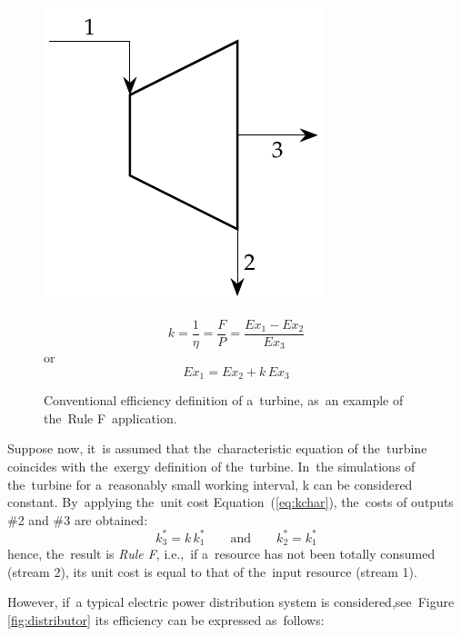 \documentclass[energies,article,accept,moreauthors,pdftex]{Definitions/mdpi}
\begin{document}
\begin{figure}[H]
	\begin{minipage}[c]{0.50\linewidth}
		\centering
		\includegraphics[scale=0.7]{turbine}
	\end{minipage}
	\begin{minipage}[c]{0.48\linewidth}
		\centering
		\begin{equation*}
		k=\frac{1}{\eta}=\frac{F}{P}=\frac{Ex_1 - Ex_2}{Ex_3}
		\label{eq:turb}
		\end{equation*}
		or
		\begin{equation*}
		Ex_1=Ex_2+k\,Ex_3
		\end{equation*}
	\end{minipage}
	\caption{Conventional efficiency definition of a~turbine, as~an example of the~Rule F~application.}
	\label{fig:turbine}
\end{figure}

Suppose now, it~is assumed that the~characteristic equation of the~turbine coincides with the~exergy definition of the~turbine. In~the simulations of the~turbine for a~reasonably small working interval, k can be considered constant. By~applying the~unit cost Equation~(\ref{eq:kchar}), the~costs of outputs \#2 and \#3 are obtained:
\begin{equation}
    k_3^*=k\,k_1^* \qquad\text{and}\qquad k_2^*=k_1^*
\end{equation}
hence, the~result is \emph{Rule F}, i.e.,~if a~resource has not been totally consumed (stream 2), its unit cost is equal to that of the~input resource (stream 1).

However, if~a typical electric power distribution system is considered,see~Figure~ \ref{fig:distributor} its efficiency can be expressed as~follows:
\end{document}
